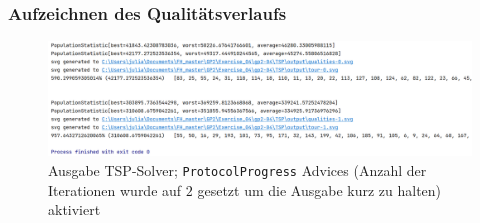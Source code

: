 \documentclass[german,notitlepage,smartquotes]{hgbreport}
\begin{document}
\subsubsection{Aufzeichnen des Qualitätsverlaufs}

\begin{figure}[h]
\centering
\includegraphics[width=.9\textwidth]{tsp-test-05}
\caption{Ausgabe TSP-Solver; \texttt{ProtocolProgress} Advices (Anzahl der Iterationen wurde auf $2$ gesetzt um die Ausgabe kurz zu halten) aktiviert}
\label{tsp-test-05}
\end{figure}
\end{document}
